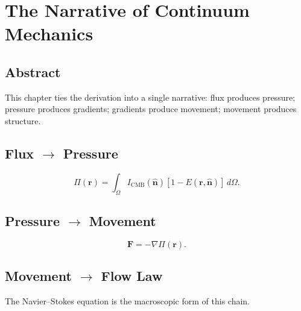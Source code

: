 \documentclass[12pt]{book}
\begin{document}
\chapter{The Narrative of Continuum Mechanics}

\section*{Abstract}
This chapter ties the derivation into a single narrative: flux produces pressure; pressure produces
gradients; gradients produce movement; movement produces structure.

\section{Flux $\rightarrow$ Pressure}
\begin{equation}
\Pi(\mathbf{r}) = \int_{\Omega} I_{\text{CMB}}(\hat{\mathbf{n}})\left[1 - E(\mathbf{r},\hat{\mathbf{n}})\right]\, d\Omega.
\end{equation}

\section{Pressure $\rightarrow$ Movement}
\begin{equation}
\mathbf{F} = -\nabla \Pi(\mathbf{r}).
\end{equation}

\section{Movement $\rightarrow$ Flow Law}
The Navier--Stokes equation is the macroscopic form of this chain.
\end{document}
